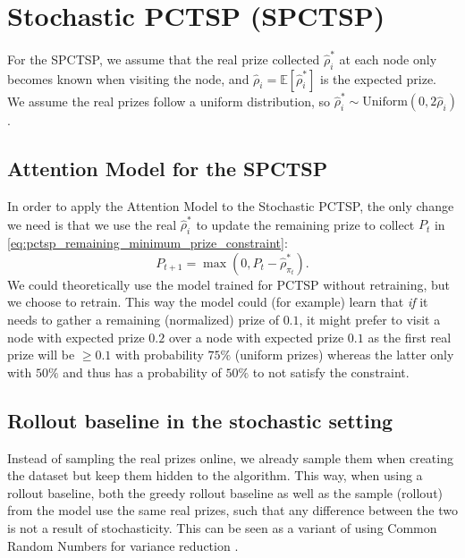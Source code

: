 
\section{Stochastic PCTSP (SPCTSP)}
For the SPCTSP, we assume that the real prize collected $\hat{\rho}^*_i$ at each node only becomes known when visiting the node, and $\hat{\rho}_i = \mathbb{E}\left[\hat{\rho}^*_i\right]$ is the expected prize. We assume the real prizes follow a uniform distribution, so $\hat{\rho}^*_i \sim \text{Uniform}(0, 2 \hat{\rho}_i)$.

\subsection{Attention Model for the SPCTSP}
In order to apply the Attention Model to the Stochastic PCTSP, the only change we need is that we use the real $\hat{\rho}^*_i$ to update the remaining prize to collect $P_t$ in \eqref{eq:pctsp_remaining_minimum_prize_constraint}:
\begin{equation}
\label{eq:stoch_pctsp_remaining_minimum_prize_constraint}
    P_{t+1} = \max(0, P_{t} - \hat{\rho}^*_{\pi_t}).
\end{equation}
We could theoretically use the model trained for PCTSP without retraining, but we choose to retrain. This way the model could (for example) learn that \emph{if} it needs to gather a remaining (normalized) prize of $0.1$, it might prefer to visit a node with expected prize $0.2$ over a node with expected prize $0.1$ as the first real prize will be $\ge 0.1$ with probability $75 \%$ (uniform prizes) whereas the latter only with $50\%$ and thus has a probability of $50\%$ to not satisfy the constraint.

\subsection{Rollout baseline in the stochastic setting}
Instead of sampling the real prizes online, we already sample them when creating the dataset but keep them hidden to the algorithm. This way, when using a rollout baseline, both the greedy rollout baseline as well as the sample (rollout) from the model use the same real prizes, such that any difference between the two is not a result of stochasticity. This can be seen as a variant of using Common Random Numbers for variance reduction \citep{glasserman1992some}.

